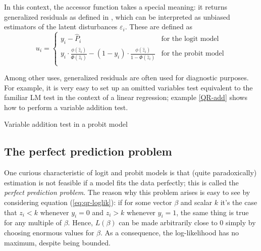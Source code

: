 In this context, the  accessor function takes a special
meaning: it returns generalized residuals as defined in
\citet*{gourieroux87}, which can be interpreted as unbiased estimators
of the latent disturbances $\varepsilon_i$. These are defined as
%
\begin{equation}
  \label{eq:QR-genres}
  u_i = \left\{
    \begin{array}{ll}
      y_i - \hat{P}_i & \textrm{for the logit model} \\
      y_i\cdot \frac{\phi(\hat{z}_i)}{\Phi(\hat{z}_i)} - 
      ( 1 - y_i ) \cdot \frac{\phi(\hat{z}_i)}{1 - \Phi(\hat{z}_i)}
      & \textrm{for the probit model} \\
    \end{array}
    \right.
\end{equation}

Among other uses, generalized residuals are often used for diagnostic
purposes.  For example, it is very easy to set up an omitted variables
test equivalent to the familiar LM test in the context of a linear
regression; example \ref{QR-add} shows how to perform a variable
addition test.

\begin{script}[htbp]
  \caption{Variable addition test in a probit model}
  \label{QR-add}
\end{script}

\subsection{The perfect prediction problem}
\label{sec:perfpred}

One curious characteristic of logit and probit models is that (quite
paradoxically) estimation is not feasible if a model fits the data
perfectly; this is called the \emph{perfect prediction problem}. The
reason why this problem arises is easy to see by considering equation
(\ref{eq:qr-loglik}): if for some vector $\beta$ and scalar $k$ it's
the case that $z_i < k$ whenever $y_i=0$ and $z_i > k$ whenever
$y_i=1$, the same thing is true for any multiple of $\beta$. Hence,
$L(\beta)$ can be made arbitrarily close to 0 simply by choosing
enormous values for $\beta$. As a consequence, the log-likelihood has
no maximum, despite being bounded.

